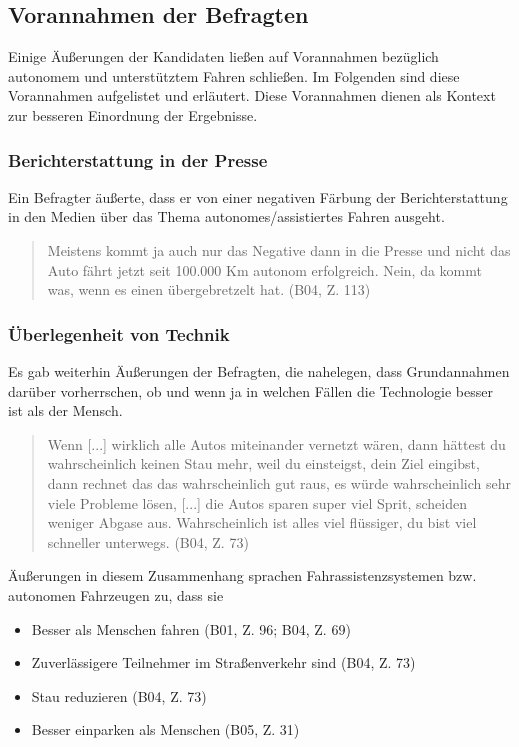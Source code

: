 \documentclass[12pt]{article}
\begin{document}
\subsection{Vorannahmen der Befragten}
Einige Äußerungen der Kandidaten ließen auf Vorannahmen bezüglich autonomem und unterstütztem Fahren schließen. Im Folgenden sind diese Vorannahmen aufgelistet und erläutert. Diese Vorannahmen dienen als Kontext zur besseren Einordnung der Ergebnisse.
\subsubsection*{Berichterstattung in der Presse}
Ein Befragter äußerte, dass er von einer negativen Färbung der Berichterstattung in den Medien über das Thema autonomes/assistiertes Fahren ausgeht.

\begin{quote}
  Meistens kommt ja auch nur das Negative dann in die Presse und nicht das Auto fährt jetzt seit 100.000 Km autonom erfolgreich. Nein, da kommt was, wenn es einen übergebretzelt hat. (B04, Z. 113)
\end{quote}

\subsubsection*{Überlegenheit von Technik}
Es gab weiterhin Äußerungen der Befragten, die nahelegen, dass Grundannahmen darüber vorherrschen, ob und wenn ja in welchen Fällen die Technologie besser ist als der Mensch.

\begin{quote}
  Wenn [...] wirklich alle Autos miteinander vernetzt wären, dann hättest du wahrscheinlich keinen Stau mehr, weil du einsteigst, dein Ziel eingibst, dann rechnet das das wahrscheinlich gut raus, es würde wahrscheinlich sehr viele Probleme lösen, [...] die Autos sparen super viel Sprit, scheiden weniger Abgase aus. Wahrscheinlich ist alles viel flüssiger, du bist viel schneller unterwegs. (B04, Z. 73)
\end{quote}

Äußerungen in diesem Zusammenhang sprachen Fahrassistenzsystemen bzw. autonomen Fahrzeugen zu, dass sie

\begin{itemize}
  \item Besser als Menschen fahren (B01, Z. 96; B04, Z. 69)
  \item Zuverlässigere Teilnehmer im Straßenverkehr sind (B04, Z. 73)
  \item Stau reduzieren (B04, Z. 73)
  \item Besser einparken als Menschen (B05, Z. 31)
\end{itemize}
\end{document}
